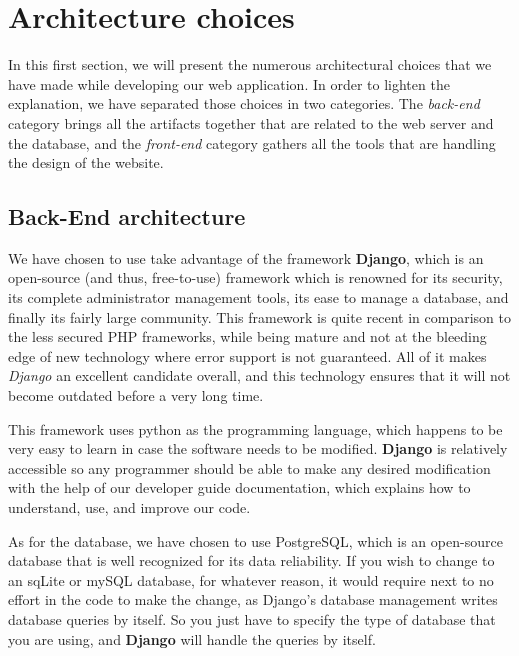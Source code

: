 \section{Architecture choices}
\label{sec:Architecture choices}


In this first section, we will present the numerous architectural choices that
we have made while developing our web application. In order to lighten the
explanation, we have separated those choices in two categories. The
\textit{back-end} category brings all the artifacts together that are related
to the web server and the database, and the \textit{front-end} category gathers
all the tools that are handling the design of the website.

\subsection{Back-End architecture}

We have chosen to use take advantage of the framework \textbf{Django}, which is
an open-source (and thus, free-to-use) framework which is renowned for its
security, its complete administrator management tools, its ease to manage a
database, and finally its fairly large community. This framework is quite
recent in comparison to the less secured PHP frameworks, while being mature and
not at the bleeding edge of new technology where error support is not
guaranteed. All of it makes \textit{Django} an excellent candidate overall, and
this technology ensures that it will not become outdated before a very long
time.\newline

This framework uses python as the programming language, which happens to be
very easy to learn in case the software needs to be modified. \textbf{Django}
is relatively accessible so any programmer should be able to make any desired
modification with the help of our developer guide documentation, which explains
how to understand, use, and improve our code.\newline

As for the database, we have chosen to use PostgreSQL, which is an open-source
database that is well recognized for its data reliability. If you wish to
change to an sqLite or mySQL database, for whatever reason, it would require
next to no effort in the code to make the change, as Django's database
management writes database queries by itself. So you just have to specify the
type of database that you are using, and \textbf{Django} will handle the
queries by itself.\newline

